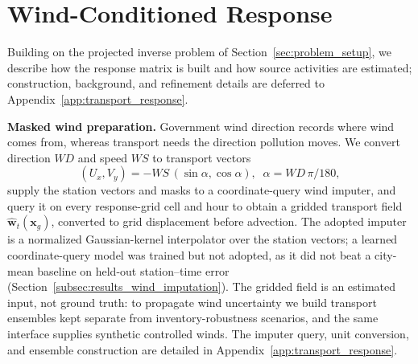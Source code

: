 \section{Wind-Conditioned Response}
\label{sec:wind_conditioned_source_apportionment}

Building on the projected inverse problem of Section~\ref{sec:problem_setup}, we
describe how the response matrix is built and how source activities are
estimated; construction, background, and refinement details are deferred to
Appendix~\ref{app:transport_response}.

\noindent\textbf{Masked wind preparation.}\label{subsec:wind_field_estimation}
Government wind direction records where wind comes from, whereas transport needs
the direction pollution moves.  We convert direction \(\mathit{WD}\) and speed
\(\mathit{WS}\) to transport vectors
\begin{equation}
(U_x,V_y)=-\mathit{WS}\,(\sin\alpha,\cos\alpha),\;\;
\alpha=\mathit{WD}\,\pi/180,
\label{eq:wind_direction_conversion}
\end{equation}
supply the station vectors and masks to a coordinate-query wind imputer, and
query it on every response-grid cell and hour to obtain a gridded transport field
\(\widehat{\mathbf w}_t(\mathbf x_g)\), converted to grid displacement before
advection.  The adopted imputer is a normalized Gaussian-kernel interpolator over
the station vectors; a learned coordinate-query model was trained but not
adopted, as it did not beat a city-mean baseline on held-out station--time error
(Section~\ref{subsec:results_wind_imputation}).  The gridded field is an
estimated input, not ground truth: to propagate wind uncertainty we build
transport ensembles kept separate from inventory-robustness scenarios, and the
same interface supplies synthetic controlled winds.  The imputer query, unit
conversion, and ensemble construction are detailed in
Appendix~\ref{app:transport_response}.

